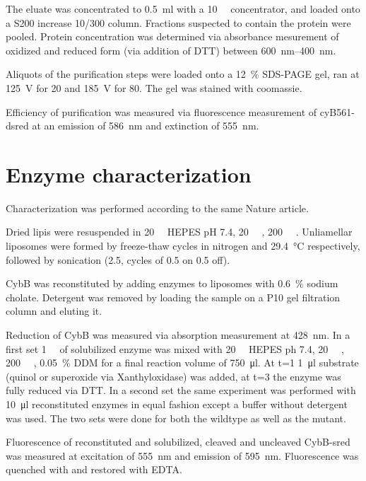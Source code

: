 \documentclass[a4paper,overfullrule=true]{scrartcl}
\begin{document}
The eluate was concentrated to \SI{0.5}{\ml} with a \SI{10}{\kilo\Da}
concentrator, and loaded onto a S200 increase 10/300 column. Fractions
suspected to contain the protein were pooled. Protein concentration was
determined via absorbance mesurement of oxidized and reduced form (via addition
of DTT) between \SIrange{600}{400}{\nm}.

Aliquots of the purification steps were loaded onto a \SI{12}{\percent}
SDS-PAGE gel, ran at \SI{125}{\V} for \SI{20}{\min} and \SI{185}{\V} for
\SI{80}{\min}. The gel was stained with coomassie.

Efficiency of purification was measured via fluorescence measurement of
cyB561-dsred at an emission of \SI{586}{\nm} and extinction of \SI{555}{\nm}.

\section{Enzyme characterization}

Characterization was performed according to the same Nature
article\cite{superoxide_salvaging}.

Dried lipis were resuspended in \SI{20}{\milli\Molar} HEPES pH 7.4,
\SI{20}{\milli\Molar} , \SI{200}{\milli\Molar} . Unliamellar
liposomes were formed by freeze-thaw cycles in nitrogen and \SI{29.4}{\celsius}
respectively, followed by sonication (\SI{2.5}{\min}, cycles of \SI{0.5}{\min}
on \SI{0.5}{\min} off).

CybB was reconstituted by adding enzymes to liposomes with \SI{0.6}{\percent}
sodium cholate. Detergent was removed by loading the sample on a P10 gel
filtration column and eluting it.

Reduction of CybB was measured via absorption measurement at \SI{428}{\nm}. In
a first set \SI{1}{\micro\Molar} of solubilized enzyme was mixed with
\SI{20}{\milli\Molar} HEPES ph 7.4, \SI{20}{\milli\Molar} ,
\SI{200}{\milli\Molar} , \SI{0.05}{\percent} DDM for a final reaction
volume of \SI{750}{\ul}. At t=\SI{1}{\min} \SI{1}{\ul} substrate (quinol or
superoxide via Xanthyloxidase) was added, at t=\SI{3}{\min} the enzyme was
fully reduced via DTT. In a second set the same experiment was performed with
\SI{10}{\ul} reconstituted enzymes in equal fashion except a buffer without
detergent was used. The two sets were done for both the wildtype as well as the
mutant.

Fluorescence of reconstituted and solubilized, cleaved and uncleaved CybB-sred
was measured at excitation of \SI{555}{\nm} and emission of \SI{595}{\nm}.
Fluorescence was quenched with  and restored with EDTA.
\end{document}
